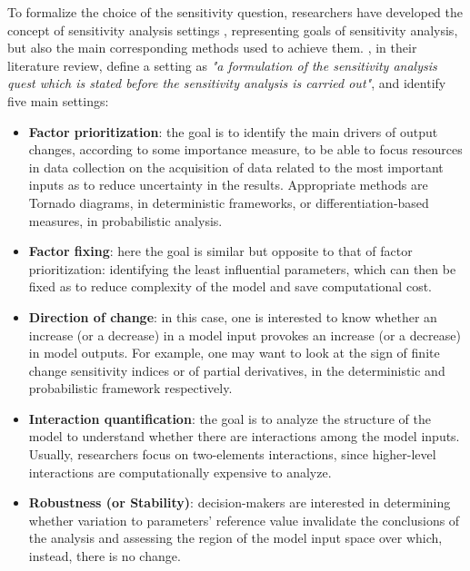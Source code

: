 To formalize the choice of the sensitivity question, researchers have developed the concept of sensitivity analysis settings \cite{Saltelli2002SensitivityAF, Saltelli2002OnTR}, representing goals of sensitivity analysis, but also the main corresponding methods used to achieve them. \textcite{Borgonovo2016SensitivityAA}, in their literature review, define a setting as \textit{"a formulation of the sensitivity analysis quest which is stated before the sensitivity analysis is carried out"}, and identify five main settings:
\begin{itemize} \label{sa_settings}
    \item \textbf{Factor prioritization}: the goal is to identify the main drivers of output changes, according to some importance measure, to be able to focus resources in data collection on the acquisition of data related to the most important inputs as to reduce uncertainty in the results. Appropriate methods are Tornado diagrams, in deterministic frameworks, or differentiation-based measures, in probabilistic analysis.
    \item \textbf{Factor fixing}: here the goal is similar but opposite to that of factor prioritization: identifying the least influential parameters, which can then be fixed as to reduce complexity of the model and save computational cost.
    \item \textbf{Direction of change}: in this case, one is interested to know whether an increase (or a decrease) in a model input provokes an increase (or a decrease) in model outputs. For example, one may want to look at the sign of finite change sensitivity indices or of partial derivatives, in the deterministic and probabilistic framework respectively.
    \item \textbf{Interaction quantification}: the goal is to analyze the structure of the model to understand whether there are interactions among the model inputs. Usually, researchers focus on two-elements interactions, since higher-level interactions are computationally expensive to analyze.
    \item \textbf{Robustness (or Stability)}: decision-makers are interested in determining whether variation to parameters' reference value invalidate the conclusions of the analysis and assessing the region of the model input space over which, instead, there is no change.
\end{itemize}




